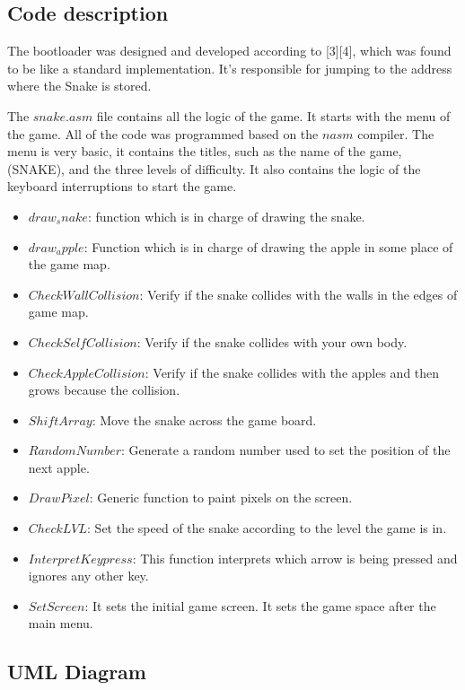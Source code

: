\documentclass[11pt]{book}
\begin{document}
\subsection*{Code description}

The bootloader was designed and developed according to [3][4], which was found to be like a standard implementation. It's responsible for jumping to the address where the Snake is stored. 

The $snake.asm$ file contains all the logic of the game. It starts with the menu of the game. All of the code was programmed based on the $nasm$ compiler. The menu is very basic, it contains the titles, such as the name of the game, (SNAKE), and the three levels of difficulty. It also contains the logic of the keyboard interruptions to start the game.

\begin{itemize}
    \item {$draw_snake$: function which is in charge of drawing the snake. }
    \item {$draw_apple$: Function which is in charge of drawing the apple in some place of the game map.}
    \item {$CheckWallCollision$: Verify if the snake collides with the walls in the edges of game map.}
    \item {$CheckSelfCollision$: Verify if the snake collides with your own body.}
    \item {$CheckAppleCollision$: Verify if the snake collides with the apples and then grows because the collision.}
    \item {$ShiftArray$: Move the snake across the game board.}
    \item {$RandomNumber$: Generate a random number used to set the position of the next apple.}
    \item {$DrawPixel$: Generic function to paint pixels on the screen.}
    \item {$CheckLVL$: Set the speed of the snake according to the level the game is in.}
    \item {$InterpretKeypress$: This function interprets which arrow is being pressed and ignores any other key.}
    \item {$SetScreen$: It sets the initial game screen. It sets the game space after the main menu.}
\end{itemize}


\subsection*{UML Diagram}
\end{document}
